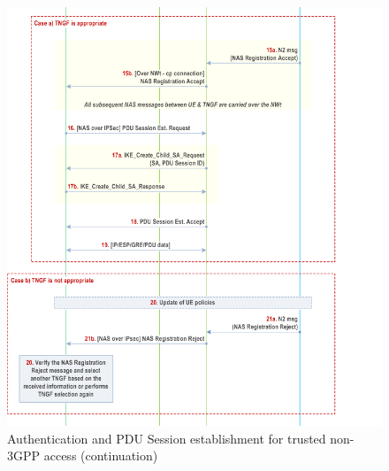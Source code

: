 \begin{figure}
    \centering
    \includegraphics[width=1\linewidth]{figs/Authentication and PDU Session establishment for trusted non-3GPP access_3.png}
    \caption{Authentication and \acs{PDU} Session establishment for trusted non-\acs{3GPP} access (continuation)}
    \label{fig:Authentication and PDU Session establishment for trusted non-3GPP access_3}
\end{figure}